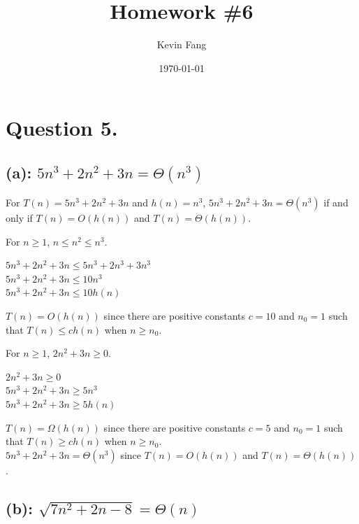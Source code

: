 \documentclass[titlepage]{article}\pagestyle{empty}
\author{Kevin Fang}
\title{Homework \#6}
\date{\today}
\begin{document}
\maketitle

\pagebreak
\section*{Question 5.}
\subsection*{(a): $5n^3 + 2n^2 + 3n = \Theta(n^3)$}

For $T(n) = 5n^3 + 2n^2 + 3n$ and $h(n) = n^3$, $5n^3 + 2n^2 + 3n = \Theta(n^3)$ if and only if $T(n) = O(h(n))$ and $T(n) = \Theta(h(n))$.\\
\begin{center}
For $n \geq 1$, $n \leq n^2 \leq n^3$.\\
\end{center}
\begin{center}
$5n^3 + 2n^2 + 3n \leq 5n^3 + 2n^3 + 3n^3$\\
$5n^3 + 2n^2 + 3n \leq 10n^3$\\
$5n^3 + 2n^2 + 3n \leq 10h(n)$\\
\end{center}
$T(n) = O(h(n))$ since there are positive constants $c = 10$ and $n_0 = 1$ such that $T(n) \leq ch(n)$ when $n \geq n_0$.\\
\begin{center}
For $n \geq 1$, $2n^2 + 3n \geq 0.$\\
\end{center}
\begin{center}
$2n^2 + 3n \geq 0$\\
$5n^3 + 2n^2 + 3n \geq 5n^3$\\
$5n^3 + 2n^2 + 3n \geq 5h(n)$\\
\end{center}
$T(n) = \Omega(h(n))$ since there are positive constants $c = 5$ and $n_0 = 1$ such that $T(n) \geq ch(n)$ when $n \geq n_0$.\\
$5n^3 + 2n^2 + 3n = \Theta(n^3)$ since $T(n) = O(h(n))$ and $T(n) = \Theta(h(n))$.\\

\subsection*{(b): $\sqrt{7n^2 + 2n - 8} = \Theta(n)$}
\end{document}
